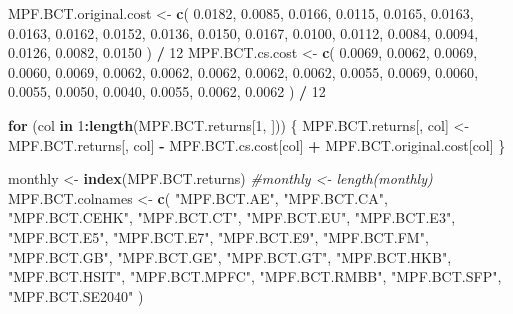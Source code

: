 \documentclass[
]{article}
\newenvironment{Shaded}{\begin{snugshade}}{\end{snugshade}}
\newcommand{\CommentTok}[1]{\textcolor[rgb]{0.56,0.35,0.01}{\textit{#1}}}
\newcommand{\ControlFlowTok}[1]{\textcolor[rgb]{0.13,0.29,0.53}{\textbf{#1}}}
\newcommand{\DecValTok}[1]{\textcolor[rgb]{0.00,0.00,0.81}{#1}}
\newcommand{\FloatTok}[1]{\textcolor[rgb]{0.00,0.00,0.81}{#1}}
\newcommand{\KeywordTok}[1]{\textcolor[rgb]{0.13,0.29,0.53}{\textbf{#1}}}
\newcommand{\NormalTok}[1]{#1}
\newcommand{\OperatorTok}[1]{\textcolor[rgb]{0.81,0.36,0.00}{\textbf{#1}}}
\newcommand{\StringTok}[1]{\textcolor[rgb]{0.31,0.60,0.02}{#1}}
\begin{document}
\begin{Shaded}
\begin{Highlighting}[]
\NormalTok{MPF.BCT.original.cost <-}
\StringTok{  }\KeywordTok{c}\NormalTok{(}
    \FloatTok{0.0182}\NormalTok{,}
    \FloatTok{0.0085}\NormalTok{,}
    \FloatTok{0.0166}\NormalTok{,}
    \FloatTok{0.0115}\NormalTok{,}
    \FloatTok{0.0165}\NormalTok{,}
    \FloatTok{0.0163}\NormalTok{,}
    \FloatTok{0.0163}\NormalTok{,}
    \FloatTok{0.0162}\NormalTok{,}
    \FloatTok{0.0152}\NormalTok{,}
    \FloatTok{0.0136}\NormalTok{,}
    \FloatTok{0.0150}\NormalTok{,}
    \FloatTok{0.0167}\NormalTok{,}
    \FloatTok{0.0100}\NormalTok{,}
    \FloatTok{0.0112}\NormalTok{,}
    \FloatTok{0.0084}\NormalTok{,}
    \FloatTok{0.0094}\NormalTok{,}
    \FloatTok{0.0126}\NormalTok{,}
    \FloatTok{0.0082}\NormalTok{,}
    \FloatTok{0.0150}
\NormalTok{  ) }\OperatorTok{/}\StringTok{ }\DecValTok{12}
\NormalTok{MPF.BCT.cs.cost <-}
\StringTok{  }\KeywordTok{c}\NormalTok{(}
    \FloatTok{0.0069}\NormalTok{,}
    \FloatTok{0.0062}\NormalTok{,}
    \FloatTok{0.0069}\NormalTok{,}
    \FloatTok{0.0060}\NormalTok{,}
    \FloatTok{0.0069}\NormalTok{,}
    \FloatTok{0.0062}\NormalTok{,}
    \FloatTok{0.0062}\NormalTok{,}
    \FloatTok{0.0062}\NormalTok{,}
    \FloatTok{0.0062}\NormalTok{,}
    \FloatTok{0.0062}\NormalTok{,}
    \FloatTok{0.0055}\NormalTok{,}
    \FloatTok{0.0069}\NormalTok{,}
    \FloatTok{0.0060}\NormalTok{,}
    \FloatTok{0.0055}\NormalTok{,}
    \FloatTok{0.0050}\NormalTok{,}
    \FloatTok{0.0040}\NormalTok{,}
    \FloatTok{0.0055}\NormalTok{,}
    \FloatTok{0.0062}\NormalTok{,}
    \FloatTok{0.0062}
\NormalTok{  ) }\OperatorTok{/}\StringTok{ }\DecValTok{12}

\ControlFlowTok{for}\NormalTok{ (col }\ControlFlowTok{in} \DecValTok{1}\OperatorTok{:}\KeywordTok{length}\NormalTok{(MPF.BCT.returns[}\DecValTok{1}\NormalTok{, ])) \{}
\NormalTok{  MPF.BCT.returns[, col] <-}
\StringTok{    }\NormalTok{MPF.BCT.returns[, col] }\OperatorTok{-}\StringTok{ }\NormalTok{MPF.BCT.cs.cost[col] }\OperatorTok{+}\StringTok{ }\NormalTok{MPF.BCT.original.cost[col]}
\NormalTok{\}}


\NormalTok{monthly <-}\StringTok{ }\KeywordTok{index}\NormalTok{(MPF.BCT.returns)}
\CommentTok{#monthly <- length(monthly)}
\NormalTok{MPF.BCT.colnames <-}\StringTok{ }
\StringTok{  }\KeywordTok{c}\NormalTok{(}
    \StringTok{"MPF.BCT.AE"}\NormalTok{,}
    \StringTok{"MPF.BCT.CA"}\NormalTok{,}
    \StringTok{"MPF.BCT.CEHK"}\NormalTok{,}
    \StringTok{"MPF.BCT.CT"}\NormalTok{,}
    \StringTok{"MPF.BCT.EU"}\NormalTok{,}
    \StringTok{"MPF.BCT.E3"}\NormalTok{,}
    \StringTok{"MPF.BCT.E5"}\NormalTok{,}
    \StringTok{"MPF.BCT.E7"}\NormalTok{,}
    \StringTok{"MPF.BCT.E9"}\NormalTok{,}
    \StringTok{"MPF.BCT.FM"}\NormalTok{,}
    \StringTok{"MPF.BCT.GB"}\NormalTok{,}
    \StringTok{"MPF.BCT.GE"}\NormalTok{,}
    \StringTok{"MPF.BCT.GT"}\NormalTok{,}
    \StringTok{"MPF.BCT.HKB"}\NormalTok{,}
    \StringTok{"MPF.BCT.HSIT"}\NormalTok{,}
    \StringTok{"MPF.BCT.MPFC"}\NormalTok{,}
    \StringTok{"MPF.BCT.RMBB"}\NormalTok{,}
    \StringTok{"MPF.BCT.SFP"}\NormalTok{,}
    \StringTok{"MPF.BCT.SE2040"}
\NormalTok{  )}


\end{Highlighting}
\end{Shaded}
\end{document}
